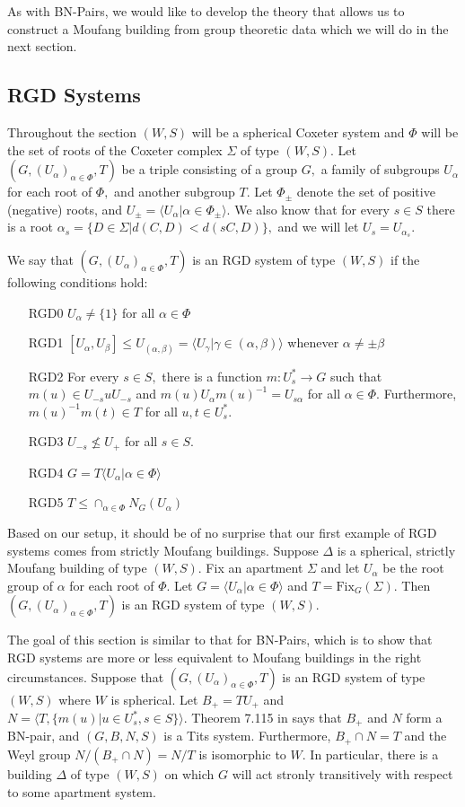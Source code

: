 \documentclass[class=book, crop=false,12 pt]{standalone}
\begin{document}
As with BN-Pairs, we would like to develop the theory that allows us to construct a Moufang building from group theoretic data which we will do in the next section.

\subsection{RGD Systems}
Throughout the section $(W,S)$ will be a spherical Coxeter system and $\Phi$ will be the set of roots of the Coxeter complex $\Sigma$ of type $(W,S).$ Let $(G,(U_\alpha)_{\alpha\in \Phi},T)$ be a triple consisting of a group $G,$ a family of subgroups $U_\alpha$ for each root of $\Phi,$ and another subgroup $T.$ Let $\Phi_{\pm}$ denote the set of positive (negative) roots, and $U_{\pm}=\langle U_\alpha|\alpha\in \Phi_{\pm}\rangle.$ We also know that for every $s\in S$ there is a root $\alpha_s=\{D\in \Sigma|d(C,D)<d(sC,D)\},$ and we will let $U_s=U_{\alpha_s}.$ 

We say that $(G,(U_{\alpha})_{\alpha\in \Phi},T)$ is an RGD system of type $(W,S)$ if the following conditions hold:
\begin{enumerate}
	\item[RGD0] $U_\alpha\neq \{1\}$ for all $\alpha\in \Phi$
	\item[RGD1] $[U_\alpha,U_\beta]\le U_{(\alpha,\beta)}=\langle U_\gamma|\gamma\in (\alpha,\beta)\rangle$ whenever $\alpha\neq \pm \beta$
	\item[RGD2] For every $s\in S,$ there is a function $m:U_s^*\to G$ such that $m(u)\in U_{-s}uU_{-s}$ and $m(u)U_\alpha m(u)^{-1}=U_{s\alpha}$ for all $\alpha\in \Phi.$ Furthermore, $m(u)^{-1}m(t)\in T$ for all $u,t\in U_s^*.$
	\item[RGD3] $U_{-s}\not\le U_+$ for all $s\in S.$
	\item[RGD4] $G=T\langle U_\alpha|\alpha\in \Phi\rangle$
	\item[RGD5] $T\le \cap_{\alpha\in \Phi}N_G(U_\alpha)$
\end{enumerate}

Based on our setup, it should be of no surprise that our first example of RGD systems comes from strictly Moufang buildings. Suppose $\Delta$ is a spherical, strictly Moufang building of type $(W,S).$ Fix an apartment $\Sigma$ and let $U_\alpha$ be the root group of $\alpha$ for each root of $\Phi.$ Let $G=\langle U_\alpha|\alpha\in \Phi\rangle$ and $T=\mathrm{Fix}_G(\Sigma).$ Then $(G,(U_\alpha)_{\alpha\in \Phi},T)$ is an RGD system of type $(W,S).$ 

The goal of this section is similar to that for BN-Pairs, which is to show that RGD systems are more or less equivalent to Moufang buildings in the right circumstances. Suppose that $(G,(U_\alpha)_{\alpha\in \Phi},T)$ is an RGD system of type $(W,S)$ where $W$ is spherical. Let $B_+=TU_+$ and $N=\langle T,\{m(u)|u\in U_s^*, s\in S\}\rangle.$ Theorem 7.115 in \cite{buildings} says that $B_+$ and $N$ form a BN-pair, and $(G,B,N,S)$ is a Tits system. Furthermore, $B_+\cap N=T$ and the Weyl group $N/(B_+\cap N)=N/T$ is isomorphic to $W.$ In particular, there is a building $\Delta$ of type $(W,S)$ on which $G$ will act stronly transitively with respect to some apartment system.
\end{document}
